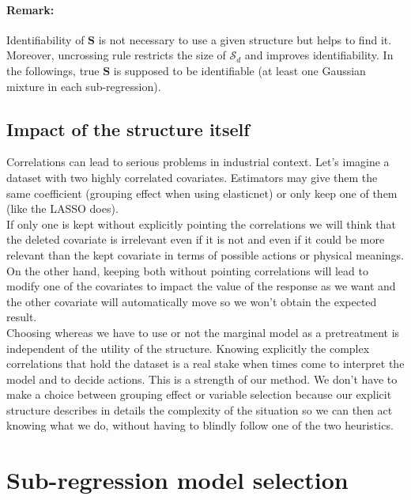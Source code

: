 \documentclass[12pt,a4paper]{report}
\begin{document}
	
\paragraph{Remark:} Identifiability of $\boldsymbol{S}$ is not necessary to use a given structure but helps to find it. Moreover, uncrossing rule restricts the size of $\mathcal{S}_d$ and improves identifiability.
In the followings, true $\boldsymbol{S}$ is supposed to be identifiable (at least one Gaussian mixture in each sub-regression).
		
	\subsection{Impact of the structure itself}
		
	
	Correlations can lead to serious problems in industrial context. Let's imagine a dataset with two highly correlated covariates. Estimators may give them the same coefficient (grouping effect when using elasticnet) or only keep one of them (like the LASSO does). \\
	
	If only one is kept without explicitly pointing the correlations we will think that the deleted covariate is irrelevant even if it is not and even if it could be more relevant than the kept covariate in terms of possible actions or physical meanings.\\
	
	 On the other hand, keeping both without pointing correlations will lead to modify one of the covariates to impact the value of the response as we want and the other covariate will automatically move so we won't obtain the expected result.\\
	 
	  Choosing whereas we have to use or not the marginal model as a pretreatment is independent of the utility of the structure. Knowing explicitly the complex correlations that hold the dataset is a real stake when times come to interpret the model and to  decide actions. This is a strength of our method. We don't have to make a choice between grouping effect or variable selection because our explicit structure describes in details the complexity of the situation so we can then act knowing what we do, without having to blindly follow one of the two heuristics.

\section{Sub-regression model selection}	
\end{document}
